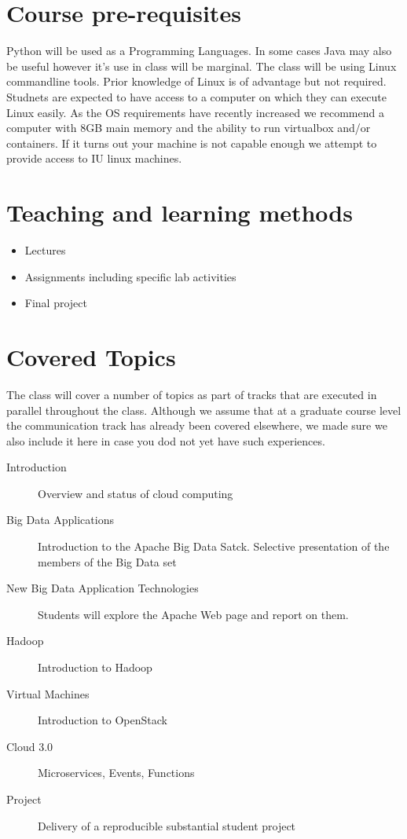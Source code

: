 \section{Course pre-requisites}

Python will be used as a Programming Languages. In some cases Java may
also be useful however it's use in class will be marginal. The class
will be using Linux commandline tools. Prior knowledge of Linux is of
advantage but not required.  Studnets are expected to have access to a
computer on which they can execute Linux easily. As the OS
requirements have recently increased we recommend a computer with 8GB
main memory and the ability to run virtualbox and/or containers. If it
turns out your machine is not capable enough we attempt to provide
access to IU linux machines.

\section{Teaching and learning methods}

\begin{itemize}
\item Lectures
\item Assignments including specific lab activities
\item Final project 
\end{itemize}

\section{Covered Topics}

The class will cover a number of topics as part of tracks that are
executed in parallel throughout the class. Although we assume that at
a graduate course level the communication track has already been
covered elsewhere, we made sure we also include it here in case you dod
not yet have such experiences.

\begin{description}

\item[Introduction] Overview and status of cloud computing
\item[Big Data Applications] Introduction to the Apache Big Data
  Satck. Selective presentation of the members of the Big Data set
\item[New Big Data Application Technologies] Students will
  explore the Apache Web page and report on them.
\item[Hadoop] Introduction to Hadoop
\item[Virtual Machines] Introduction to OpenStack
\item[Cloud 3.0] Microservices, Events, Functions  
\item[Project] Delivery of a reproducible substantial student project
 
\end{description}


